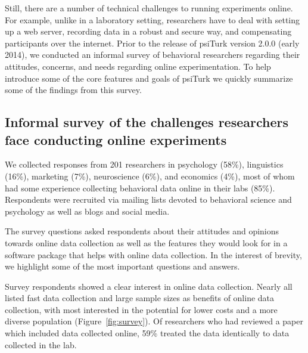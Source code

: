 \documentclass[twocolumn]{svjour3}          %
\newcommand{\psiturk}[0]{\textsf{psiTurk}}
\begin{document}
Still, there are a number of technical challenges to running experiments online.
For example, unlike in a laboratory setting, researchers have to 
deal with setting up a web server, recording data in a robust and secure way, 
and compensating participants over the internet.  
Prior to the release of \psiturk{} version
2.0.0 (early 2014), we conducted an informal survey of behavioral researchers 
regarding their attitudes, concerns, and needs regarding online experimentation. 
To help introduce some of the core features and goals of \psiturk{} we 
quickly summarize some of the findings from this survey.



\subsection{Informal survey of the challenges researchers face conducting online experiments}
 We collected responses from 201 researchers in psychology (58\%),
linguistics (16\%), marketing (7\%), neuroscience (6\%), and economics (4\%), most of 
whom had some experience collecting behavioral data online in their labs (85\%).  
Respondents were recruited via mailing lists devoted to behavioral science and psychology 
as well as blogs and social media. 

The survey questions asked respondents about their attitudes and opinions towards
online data collection as well as the features they would look for in a software package
that helps with online data collection.  In the interest of brevity, we highlight some of the
most important questions and answers.

Survey respondents showed a clear interest in online data collection. Nearly all listed fast data
collection and large sample sizes as benefits of online data collection, with most
interested in the potential for lower costs and a more diverse population
(Figure~\ref{fig:survey}). Of researchers who had reviewed a paper which included data 
collected online, 59\% treated the data identically to data collected in the lab.


\end{document}
